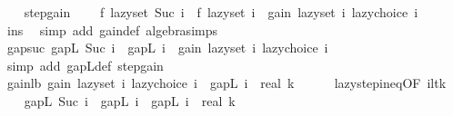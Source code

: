 \begin{isabellebody}
\isanewline
\isanewline
\ \ \isamarkupfalse%
\ step{\isacharunderscore}{\kern0pt}gain{\isacharcolon}{\kern0pt}\isanewline
\ \ \ \ {\isachardoublequoteopen}f\ {\isacharparenleft}{\kern0pt}lazy{\isacharunderscore}{\kern0pt}set\ {\isacharparenleft}{\kern0pt}Suc\ i{\isacharparenright}{\kern0pt}{\isacharparenright}{\kern0pt}\ {\isacharequal}{\kern0pt}\ f\ {\isacharparenleft}{\kern0pt}lazy{\isacharunderscore}{\kern0pt}set\ i{\isacharparenright}{\kern0pt}\ {\isacharplus}{\kern0pt}\ gain\ {\isacharparenleft}{\kern0pt}lazy{\isacharunderscore}{\kern0pt}set\ i{\isacharparenright}{\kern0pt}\ {\isacharparenleft}{\kern0pt}lazy{\isacharunderscore}{\kern0pt}choice\ i{\isacharparenright}{\kern0pt}{\isachardoublequoteclose}\isanewline
\ \ \ \ \isamarkupfalse%
\ ins\ \isamarkupfalse%
\ {\isacharparenleft}{\kern0pt}simp\ add{\isacharcolon}{\kern0pt}\ gain{\isacharunderscore}{\kern0pt}def\ algebra{\isacharunderscore}{\kern0pt}simps{\isacharparenright}{\kern0pt}\isanewline
\isanewline
\ \ \isamarkupfalse%
\ gap{\isacharunderscore}{\kern0pt}suc{\isacharcolon}{\kern0pt}\ {\isachardoublequoteopen}gapL\ {\isacharparenleft}{\kern0pt}Suc\ i{\isacharparenright}{\kern0pt}\ {\isacharequal}{\kern0pt}\ gapL\ i\ {\isacharminus}{\kern0pt}\ gain\ {\isacharparenleft}{\kern0pt}lazy{\isacharunderscore}{\kern0pt}set\ i{\isacharparenright}{\kern0pt}\ {\isacharparenleft}{\kern0pt}lazy{\isacharunderscore}{\kern0pt}choice\ i{\isacharparenright}{\kern0pt}{\isachardoublequoteclose}\isanewline
\ \ \ \ \isamarkupfalse%
\ {\isacharparenleft}{\kern0pt}simp\ add{\isacharcolon}{\kern0pt}\ gapL{\isacharunderscore}{\kern0pt}def\ step{\isacharunderscore}{\kern0pt}gain{\isacharparenright}{\kern0pt}\isanewline
\isanewline
\ \ \isamarkupfalse%
\ gain{\isacharunderscore}{\kern0pt}lb{\isacharcolon}{\kern0pt}\ {\isachardoublequoteopen}gain\ {\isacharparenleft}{\kern0pt}lazy{\isacharunderscore}{\kern0pt}set\ i{\isacharparenright}{\kern0pt}\ {\isacharparenleft}{\kern0pt}lazy{\isacharunderscore}{\kern0pt}choice\ i{\isacharparenright}{\kern0pt}\ {\isasymge}\ gapL\ i\ {\isacharslash}{\kern0pt}\ real\ k{\isachardoublequoteclose}\isanewline
\ \ \ \ \isamarkupfalse%
\ lazy{\isacharunderscore}{\kern0pt}step{\isacharunderscore}{\kern0pt}ineq{\isacharbrackleft}{\kern0pt}OF\ i{\isacharunderscore}{\kern0pt}lt{\isacharunderscore}{\kern0pt}k{\isacharbrackright}{\kern0pt}\ \isakeywordONE{{\isachardot}{\kern0pt}}\isamarkupfalse%
\isanewline
\isanewline
\ \ \isamarkupfalse%
\ {\isachardoublequoteopen}gapL\ {\isacharparenleft}{\kern0pt}Suc\ i{\isacharparenright}{\kern0pt}\ {\isasymle}\ gapL\ i\ {\isacharminus}{\kern0pt}\ gapL\ i\ {\isacharslash}{\kern0pt}\ real\ k{\isachardoublequoteclose}\isanewline

\end{isabellebody}
